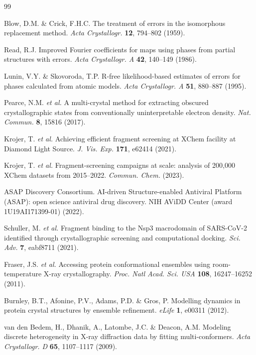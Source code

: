 \documentclass[10pt,twocolumn]{article}
\begin{document}
\begin{thebibliography}{99}
\small

Blow, D.M. \& Crick, F.H.C.
The treatment of errors in the isomorphous replacement method.
\textit{Acta Crystallogr.} \textbf{12}, 794--802 (1959).

Read, R.J.
Improved Fourier coefficients for maps using phases from partial
structures with errors.
\textit{Acta Crystallogr. A} \textbf{42}, 140--149 (1986).

Lunin, V.Y. \& Skovoroda, T.P.
R-free likelihood-based estimates of errors for phases calculated
from atomic models.
\textit{Acta Crystallogr. A} \textbf{51}, 880--887 (1995).

Pearce, N.M. \textit{et al.}
A multi-crystal method for extracting obscured crystallographic
states from conventionally uninterpretable electron density.
\textit{Nat. Commun.} \textbf{8}, 15816 (2017).

Krojer, T. \textit{et al.}
Achieving efficient fragment screening at XChem facility at
Diamond Light Source.
\textit{J. Vis. Exp.} \textbf{171}, e62414 (2021).

Krojer, T. \textit{et al.}
Fragment-screening campaigns at scale: analysis of 200,000
XChem datasets from 2015--2022. \textit{Commun. Chem.} (2023).

ASAP Discovery Consortium.
AI-driven Structure-enabled Antiviral Platform (ASAP): open
science antiviral drug discovery.
NIH AViDD Center (award 1U19AI171399-01) (2022).

Schuller, M. \textit{et al.}
Fragment binding to the Nsp3 macrodomain of SARS-CoV-2
identified through crystallographic screening and computational
docking.
\textit{Sci. Adv.} \textbf{7}, eabf8711 (2021).

Fraser, J.S. \textit{et al.}
Accessing protein conformational ensembles using room-temperature
X-ray crystallography.
\textit{Proc. Natl Acad. Sci. USA} \textbf{108}, 16247--16252 (2011).

Burnley, B.T., Afonine, P.V., Adams, P.D. \& Gros, P.
Modelling dynamics in protein crystal structures by ensemble
refinement.
\textit{eLife} \textbf{1}, e00311 (2012).

van den Bedem, H., Dhanik, A., Latombe, J.C. \& Deacon, A.M.
Modeling discrete heterogeneity in X-ray diffraction data by
fitting multi-conformers.
\textit{Acta Crystallogr. D} \textbf{65}, 1107--1117 (2009).


\end{thebibliography}
\end{document}

